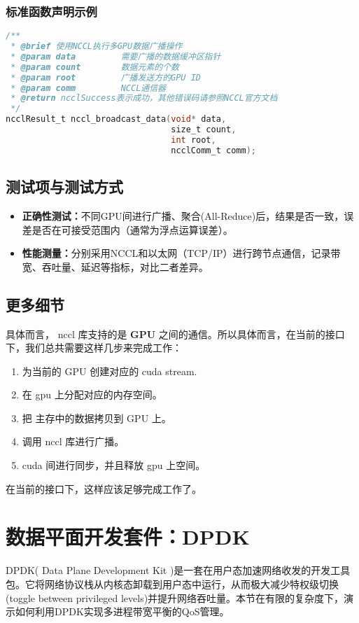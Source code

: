 \begin{enumerate}
\subsubsection{标准函数声明示例}
\begin{lstlisting}[language=C, caption={示例：NCCL通信例程接口}]
/**
 * @brief 使用NCCL执行多GPU数据广播操作
 * @param data         需要广播的数据缓冲区指针
 * @param count        数据元素的个数
 * @param root         广播发送方的GPU ID
 * @param comm         NCCL通信器
 * @return ncclSuccess表示成功，其他错误码请参照NCCL官方文档
 */
ncclResult_t nccl_broadcast_data(void* data, 
                                 size_t count, 
                                 int root, 
                                 ncclComm_t comm);
\end{lstlisting}

\subsection{测试项与测试方式}
\begin{itemize}
    \item \textbf{正确性测试：}不同GPU间进行广播、聚合(All-Reduce)后，结果是否一致，误差是否在可接受范围内（通常为浮点运算误差）。
    \item \textbf{性能测量：}分别采用NCCL和以太网（TCP/IP）进行跨节点通信，记录带宽、吞吐量、延迟等指标，对比二者差异。
\end{itemize}

\subsection{更多细节}
具体而言， nccl 库支持的是 \textbf{GPU} 之间的通信。所以具体而言，在当前的接口下，我们总共需要这样几步来完成工作：
\begin{enumerate}
    \item 为当前的 GPU 创建对应的 cuda stream.
    \item 在 gpu 上分配对应的内存空间。
    \item 把 主存中的数据拷贝到 GPU 上。
    \item 调用 nccl 库进行广播。
    \item cuda 间进行同步，并且释放 gpu 上空间。
\end{enumerate}
在当前的接口下，这样应该足够完成工作了。

\section{数据平面开发套件：DPDK}
DPDK( Data Plane Development Kit )是一套在用户态加速网络收发的开发工具包。它将网络协议栈从内核态卸载到用户态中运行，从而极大减少特权级切换(toggle between privileged levels)并提升网络吞吐量。本节在有限的复杂度下，演示如何利用DPDK实现多进程带宽平衡的QoS管理。


\end{enumerate}
